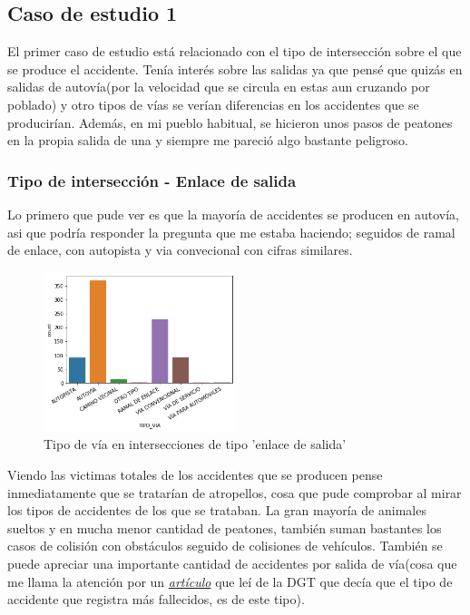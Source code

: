 \subsection{Caso de estudio 1}

El primer caso de estudio está relacionado con el tipo de intersección sobre el que se produce el accidente. Tenía interés sobre las salidas ya que pensé que quizás en salidas de autovía(por la velocidad que se circula en estas aun cruzando por poblado) y otro tipos de vías se verían diferencias en los accidentes que se producirían. Además, en mi pueblo habitual, se hicieron unos pasos de peatones en la propia salida de una y siempre me pareció algo bastante peligroso.

\subsubsection{Tipo de intersección - Enlace de salida}


Lo primero que pude ver es que la mayoría de accidentes se producen en autovía, asi que podría responder la pregunta que me estaba haciendo; seguidos de ramal de enlace, con autopista y via convecional con cifras similares.

\begin{figure}[H]
\centering
\includegraphics[width=0.5\textwidth]{imagenes/tipo_via_caso1.png}
\caption{Tipo de vía en intersecciones de tipo 'enlace de salida'}
\end{figure}

Viendo las victimas totales de los accidentes que se producen pense inmediatamente que se tratarían de atropellos, cosa que pude comprobar al mirar los tipos de accidentes de los que se trataban. La gran mayoría de animales sueltos y en mucha menor cantidad de peatones, también suman bastantes los casos de colisión con obstáculos seguido de colisiones de vehículos. También se puede apreciar una importante cantidad de accidentes por salida de vía(cosa que me llama la atención por un \href{http://www.dgt.es/es/prensa/notas-de-prensa/2014/20140103-balance-2013-seguridad-vial-2013.shtml}{\textit{artículo}} que leí de la DGT que decía que el tipo de accidente que registra más fallecidos, es de este tipo).

